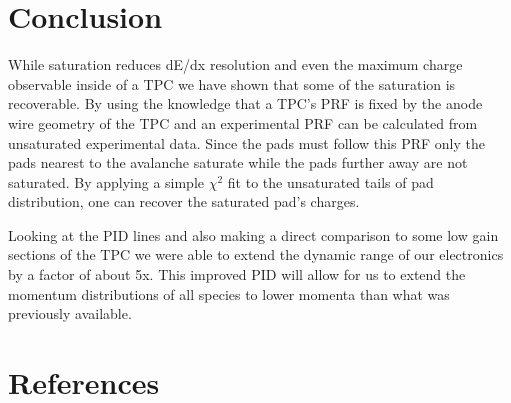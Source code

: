 \documentclass[review]{elsarticle}
\begin{document}


\section{Conclusion}
While saturation reduces dE/dx resolution and even the maximum charge observable inside of a TPC we have shown that some of the saturation is recoverable. By using the knowledge that a TPC's PRF is fixed by the anode wire geometry of the TPC and an experimental PRF can be calculated from unsaturated experimental data. Since the pads must follow this PRF only the pads nearest to the avalanche saturate while the pads further away are not saturated. By applying a simple $\chi^2$ fit to the unsaturated tails of pad distribution, one can recover the saturated pad's charges. 

Looking at the PID lines and also making a direct comparison to some low gain sections of the TPC we were able to extend the dynamic range of our electronics by a factor of about 5x. This improved PID will allow for us to extend the momentum distributions of all species to lower momenta than what was previously available. 

\section*{References}


\end{document}
